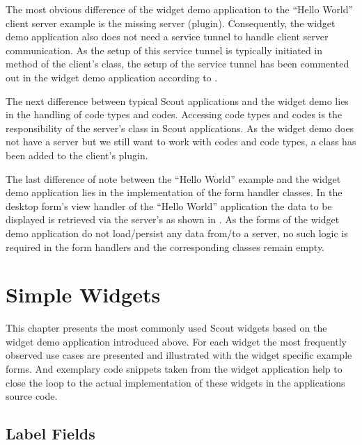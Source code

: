 \documentclass[a4paper,10pt,twoside]{book}
\begin{document}
{The most obvious difference of the widget demo application to the ``Hello World'' client server example is the missing server (plugin). 
Consequently, the widget demo application also does not need a service tunnel to handle client server communication.
As the setup of this service tunnel is typically initiated in method  of the client's  class, 
the setup of the service tunnel has been commented out in the widget demo application according to . 

The next difference between typical Scout applications and the widget demo lies in the handling of code types and codes. 
Accessing code types and codes is the responsibility of the server's  class in Scout applications. 
As the widget demo does not have a server but we still want to work with codes and code types, a  class has been added to the client's plugin. 

The last difference of note between the ``Hello World'' example and the widget demo application lies in the implementation of the form handler classes. 
In the desktop form's view handler of the ``Hello World'' application the data to be displayed is retrieved via the server's  as shown in . 
As the forms of the widget demo application do not load/persist any data from/to a server, no such logic is required in the form handlers and the corresponding classes remain empty. 

\chapter{Simple Widgets}

This chapter presents the most commonly used Scout widgets based on the widget demo application introduced above. 
For each widget the most frequently observed use cases are presented and illustrated with the widget specific example forms. 
And exemplary code snippets taken from the widget application help to close the loop to the actual implementation of these widgets in the applications source code.

\section{Label Fields}

}
\end{document}
